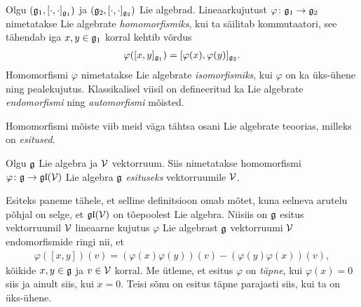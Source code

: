 Olgu $(\mathfrak{g}_1, [\cdot, \cdot]_{\mathfrak{g}_1})$ ja $(\mathfrak{g}_2, [\cdot, \cdot]_{\mathfrak{g}_2})$ Lie
algebrad. Lineaarkujutust $\varphi \colon \mathfrak{g}_1 \to \mathfrak{g}_2$ nimetatakse
Lie algebrate \emph{homomorfismiks}, kui ta säilitab kommutaatori, see
tähendab iga $x, y \in \mathfrak{g}_1$ korral kehtib võrdus
\begin{align*}
    \varphi([x, y]_{\mathfrak{g}_1}) = [\varphi(x), \varphi(y)]_{\mathfrak{g}_2}.
\end{align*}
Homomorfismi $\varphi$ nimetatakse Lie algebrate \emph{isomorfismiks},
kui $\varphi$ on ka üks-ühene ning pealekujutus. Klassikalisel viisil on
defineeritud ka Lie algebrate \emph{endomorfismi} ning \emph{automorfismi}
mõisted.

Homomorfismi mõiste viib meid väga tähtsa osani Lie algebrate teoorias,
milleks on \emph{esitused}.

\begin{dfn}
    Olgu $\mathfrak{g}$ Lie algebra ja $\mathcal{V}$ vektorruum. Siis nimetatakse homomorfismi
    $\varphi \colon \mathfrak{g} \to \mathfrak{gl}(\mathcal{V})$ Lie algebra $\mathfrak{g}$ \emph{esituseks}
    vektorruumile $\mathcal{V}$.
\end{dfn}

Esiteks paneme tähele, et selline definitsioon omab mõtet, kuna
eelneva arutelu põhjal on selge, et $\mathfrak{gl}(\mathcal{V})$ on tõepoolest Lie algebra.
Niisiis on $\mathfrak{g}$ esitus vektorruumil $\mathcal{V}$ lineaarne kujutus $\varphi$
Lie algebrast $\mathfrak{g}$ vektorruumi $\mathcal{V}$ endomorfismide ringi nii, et
\begin{align*}
    \varphi([x, y])(v) = \left( \varphi(x)\varphi(y) \right) (v) -
                         \left( \varphi(y)\varphi(x) \right) (v),
\end{align*}
kõikide $x, y \in \mathfrak{g}$ ja $v \in \mathcal{V}$ korral. Me ütleme, et esitus $\varphi$
on \emph{täpne}, kui $\varphi(x) = 0$ siis ja ainult siis, kui $x = 0$. Teisi
sõnu on esitus täpne parajasti siis, kui ta on üks-ühene.


